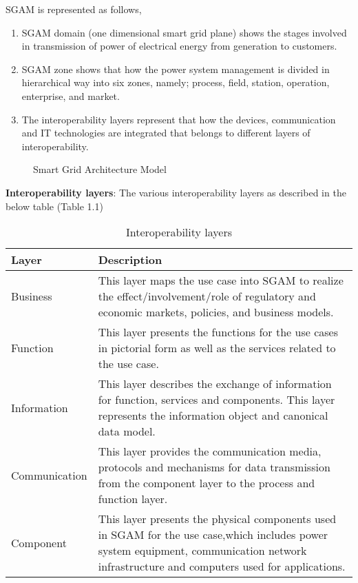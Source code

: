 \documentclass{article}
\begin{document}
SGAM is represented as follows,
\begin{enumerate}
	\item SGAM domain (one dimensional smart grid plane) shows the stages involved in
	transmission of power of electrical energy from generation to customers.
	\item SGAM zone shows that how the power system management is divided in hierarchical
	way into six zones, namely; process, field, station, operation, enterprise, and market.
	\item The interoperability layers represent that how the devices, communication and IT
	technologies are integrated that belongs to different layers of interoperability.
\end{enumerate}
\begin{figure}[htb]
	\centering
	\caption{Smart Grid Architecture Model }
	\label{fig:Smart Grid Architecture Model }
\end{figure}

\textbf{Interoperability layers}: The various interoperability layers as described in the below table (Table 1.1)

\begin{table}[h!t]
	\begin{center}
		\begin{tabular} { | l | p{11cm} | }
			\hline
			\textbf{Layer} & \textbf{Description} \\ 
			\hline
			Business & This layer maps the use case into SGAM to realize the
			effect/involvement/role of regulatory and economic markets, policies, and
			business models. \\ 
			\hline
			Function & This layer presents the functions for the use cases in pictorial form as well as the services related to the use case. \\ 
			\hline
			Information & This layer describes the exchange of information for function, services and components. This layer represents the information object and
			canonical data model. \\ 
			\hline
			Communication & This layer provides the communication media, protocols and mechanisms for data transmission from the component layer to the process and
			function layer. \\ 
			\hline
			Component & This layer presents the physical components used in SGAM for the use case,which includes power system equipment, communication network
			infrastructure and computers used for applications. \\ 
			\hline
			
		\end{tabular}
	\end{center}
	\caption{Interoperability layers}
	\label{table:1} 
\end{table}
\end{document}

